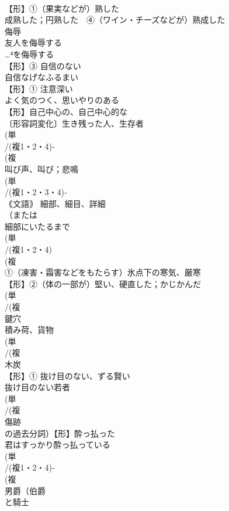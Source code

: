 \documentclass[8pt]{extreport}
\begin{document}
\begin{CJK}{UTF8}{min}
\\	【形】①（果実などが）熟した　
\\	成熟した；円熟した　④（ワイン・チーズなどが）熟成した
\\	侮辱 
\\	友人を侮辱する 
\\	…⁴を侮辱する
\\	【形】③ 自信のない 
\\	自信なげなふるまい
\\	【形】① 注意深い 
\\	よく気のつく、思いやりのある
\\	【形】自己中心の、自己中心的な 
\\	〔形容詞変化〕生き残った人、生存者 
\\	(単
\\	/(複1・2・4)-
\\	(複
\\	叫び声、叫び；悲鳴 
\\	(単
\\	/(複1・2・3・4)‐
\\	｟文語｠ 細部、細目、詳細 
\\	（または
\\	細部にいたるまで
\\	(単
\\	/(複1・2・4)
\\	(複
\\	①（凍害・霜害などをもたらす）氷点下の寒気、厳寒 
\\	【形】②（体の一部が）堅い、硬直した；かじかんだ
\\	(単
\\	/(複
\\	鍵穴 
\\	積み荷、貨物 
\\	(単
\\	/(複
\\	木炭 
\\	【形】① 抜け目のない、ずる賢い 
\\	抜け目のない若者 
\\	(単
\\	/(複
\\	傷跡 
\\	の過去分詞）【形】酔っ払った 
\\	君はすっかり酔っ払っている
\\	(単
\\	/(複1・2・4)-
\\	(複
\\	男爵（伯爵
\\	と騎士

\end{CJK}
\end{document}

